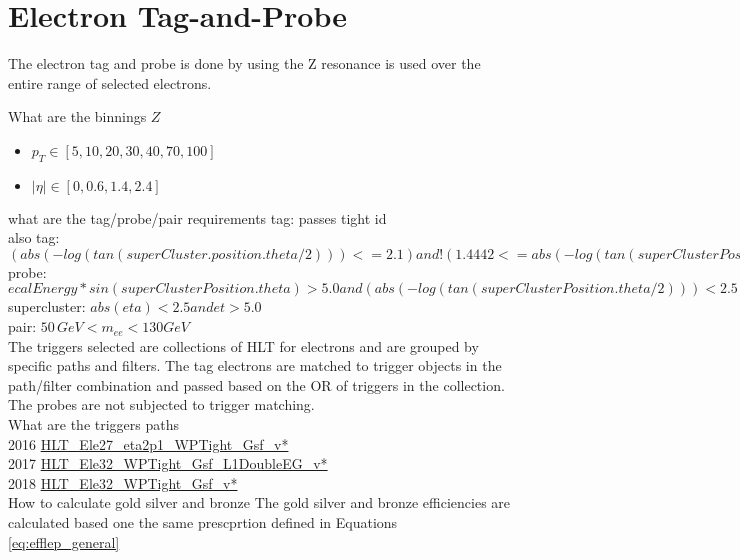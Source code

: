 
\FloatBarrier
\section{Electron Tag-and-Probe }

The electron tag and probe is done by using the Z resonance is used over the entire \pt range of selected electrons. 

What are the binnings
$Z$
	\begin{itemize}
		\item[] $ p_T \in [5, 10, 20, 30, 40, 70, 100]$
		\item[] $|\eta| \in [ 0, 0.6, 1.4, 2.4]$
	\end{itemize}


what are the tag/probe/pair requirements
tag: passes tight id \\ 
also tag: $(abs(-log(tan(superCluster.position.theta/2)))<=2.1) and !(1.4442<=abs(-log(tan(superClusterPosition.theta/2)))<=1.566) and pt >= 30.0$ \\
probe: $ecalEnergy*sin(superClusterPosition.theta)>5.0 and  (abs(-log(tan(superClusterPosition.theta/2)))<2.5)$
supercluster: $abs(eta)<2.5 and  et>5.0$ \\
pair: $50 \, GeV<m_{ee}<130 GeV$ \\

The triggers selected are collections of HLT for electrons and are grouped by specific paths and filters. The tag electrons are matched to trigger objects in the path/filter combination and passed based on the OR of triggers in the collection. The probes are not subjected to trigger matching.\\

What are the triggers paths\\ 
2016 \url{HLT_Ele27_eta2p1_WPTight_Gsf_v*}\\
2017 \url{HLT_Ele32_WPTight_Gsf_L1DoubleEG_v*}\\
2018 \url{HLT_Ele32_WPTight_Gsf_v*}\\

How to calculate gold silver and bronze
The gold silver and bronze efficiencies are calculated  based one the same prescprtion defined in Equations \ref{eq:efflep_general}

